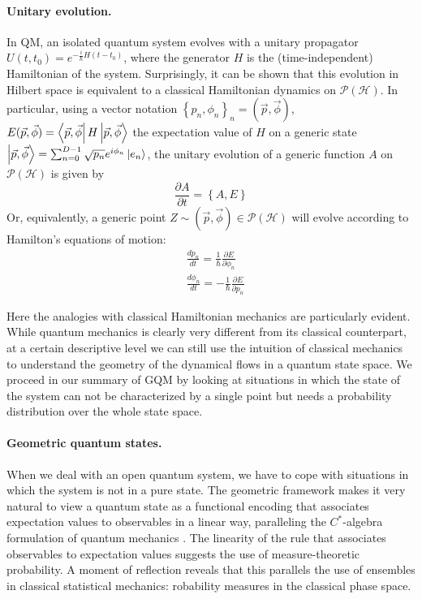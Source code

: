 \documentclass[%
 reprint,
 superscriptaddress,
 aps,
 pra,
]{revtex4-2}
\newcommand{\PH}{\mathcal{P}(\mathcal{H})}
\theoremstyle{definition}
\begin{document}
\paragraph*{Unitary evolution.} In QM, an isolated quantum system evolves
with a unitary propagator $U(t,t_0) = e^{-\frac{i}{\hbar}H (t-t_0)}$, where the
generator $H$ is the (time-independent) Hamiltonian of the system. Surprisingly, 
it can be shown \cite{Bengtsson2017GeometryQuantumStates} that this evolution in Hilbert space is equivalent to 
a classical Hamiltonian dynamics on $\PH$. In particular, using a vector notation $\left\{ p_n,\phi_n\right\}_n = (\vec{p},\vec{\phi})$, 
$E(\vec{p}, \vec{\phi}) = \bra{\vec{p},\vec{\phi}}H \ket{\vec{p},\vec{\phi}}$
the expectation value of $H$ on a generic state $\ket{\vec{p},\vec{\phi}} = \sum_{n=0}^{D-1}\sqrt{p_n}e^{i\phi_n}\ket{e_n}$, 
the unitary evolution of a generic function $A$ on $\PH$ is given by 
\begin{equation}
\frac{\partial A}{\partial t} = \left\{ A,E\right\}
\end{equation}
Or, equivalently, a generic point $Z \sim (\vec{p},\vec{\phi}) \in \PH$
will evolve according to Hamilton's equations of motion:
\begin{subequations}\label{eq:HAM_EOM}
\begin{align}
&\frac{dp_n}{dt} = \frac{1}{\hbar}\frac{\partial E}{\partial \phi_n} \\
&\frac{d\phi_n}{dt} = -\frac{1}{\hbar}\frac{\partial E}{\partial p_n} 
\end{align}
\end{subequations}

Here the analogies with classical Hamiltonian mechanics are particularly evident.
While quantum mechanics is clearly very different from its classical
counterpart, at a certain descriptive level we can still use the intuition
of classical mechanics to understand the geometry of the dynamical flows in a
quantum state space. We proceed in our summary of GQM by looking at situations 
in which the state of the system can not be characterized by a single point but needs 
a probability distribution over the whole state space.


\paragraph*{Geometric quantum states.}
When we deal with an open quantum system, we have to cope with situations in 
which the system is not in a pure state. The geometric framework makes it very natural 
to view a quantum state as a functional encoding that associates expectation values to 
observables in a linear way, paralleling the $C^{*}$-algebra formulation of quantum 
mechanics \cite{Strocchi2008IntroductionMathematicalStructure}. The linearity of the rule that associates observables to 
expectation values suggests the use of measure-theoretic probability. A moment of 
reflection reveals that this parallels the use of ensembles in classical statistical mechanics: 
robability measures in the classical phase space. 
\end{document}
